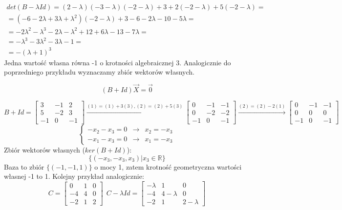 \documentclass[12pt,a4paper]{article}
\begin{document}
\[
\begin{array}{c}
det(B-\lambda Id) = (2-\lambda)(-3-\lambda)(-2-\lambda) + 3 + 2(-2-\lambda) + 5(-2-\lambda)=\\
=(-6-2\lambda+3\lambda+\lambda^2)(-2-\lambda)+3-6-2\lambda-10-5\lambda=\\
=-2\lambda^2-\lambda^3-2\lambda-\lambda^2+12+6\lambda-13-7\lambda=\\
=-\lambda^3-3\lambda^2-3\lambda-1=\\
=-(\lambda+1)^3
\end{array}
\]
Jedna wartość własna równa -1 o krotności algebraicznej 3. Analogicznie do poprzedniego przykładu wyznaczamy zbiór wektorów własnych.

\[
(B+Id)\vec{X}=\vec{0}
\]

\[
B+Id=
\left[
\begin{array}{ccc}
3 & -1 & 2\\
5 & -2 & 3\\
-1 & 0 & -1
\end{array}\right]
\xrightarrow{(1)=(1)+3(3), (2)=(2)+5(3)}
\left[
\begin{array}{ccc}
0 & -1 & -1\\
0 & -2 & -2\\
-1 & 0 & -1
\end{array}\right]
\xrightarrow{(2)=(2)-2(1)}
\left[
\begin{array}{ccc}
0 & -1 & -1\\
0 & 0 & 0\\
-1 & 0 & -1
\end{array}\right]
\]
\[
\left\{ 
\begin{array}{llllllll}
-x_2 - x_3 = 0 & \rightarrow & x_2=-x_3\\
-x_1 - x_3 = 0 & \rightarrow & x_1=-x_3
\end{array} \right.
\]
Zbiór wektorów własnych (\(ker(B+Id)\)):
\[
\{(-x_3,-x_3,x_3)| x_3\in \mathbb{R}\}
\]
Baza to zbiór \(\{(-1,-1,1)\}\) o mocy 1, zatem krotność geometryczna wartości własnej -1 to 1. Kolejny przykład analogicznie:
\[
C=
\left[
\begin{array}{ccc}
0 & 1 & 0\\
-4 & 4 & 0\\
-2 & 1 & 2
\end{array}\right]
~~C-\lambda Id=
\left[
\begin{array}{ccc}
-\lambda & 1 & 0\\
-4 & 4-\lambda & 0\\
-2 & 1 & 2-\lambda
\end{array}\right]
\]
\end{document}
